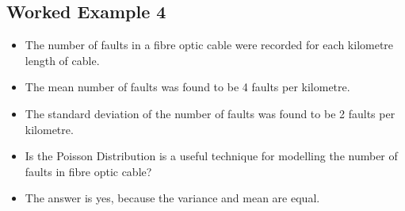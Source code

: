 \documentclass[a4paper,12pt]{article}
\begin{document}
\subsection*{Worked Example 4} 

\begin{itemize}
\item The number of faults in a fibre optic cable were recorded for each kilometre length of cable.
\item The mean number of faults was found to be 4 faults per kilometre.
\item The standard deviation of the number of faults was found to be 2 faults per kilometre.
\item Is the Poisson Distribution is a useful technique for modelling the number of faults in fibre optic cable?
\item The answer is yes, because the variance and mean are equal. 
\end{itemize}
\end{document}
